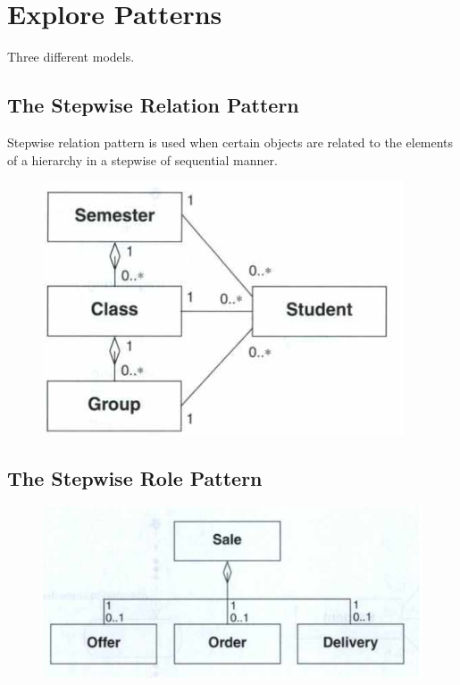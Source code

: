 \section{Explore Patterns \ooad[104]}
Three different models.

\subsection*{The Stepwise Relation Pattern \ooad[104]}
Stepwise relation pattern is used when certain objects are related to the elements of a hierarchy in a stepwise of sequential manner.
\begin{figure}[H]
    \centering
    \includegraphics[width=\linewidth/2]{chapters/behavior/figures/stepwise_relation.png}
\end{figure}
\subsection*{The Stepwise Role Pattern \ooad[104]} 
\begin{figure}[H]
    \centering
    \includegraphics[width=\linewidth/2]{chapters/behavior/figures/stepwise_role.png}
\end{figure}

